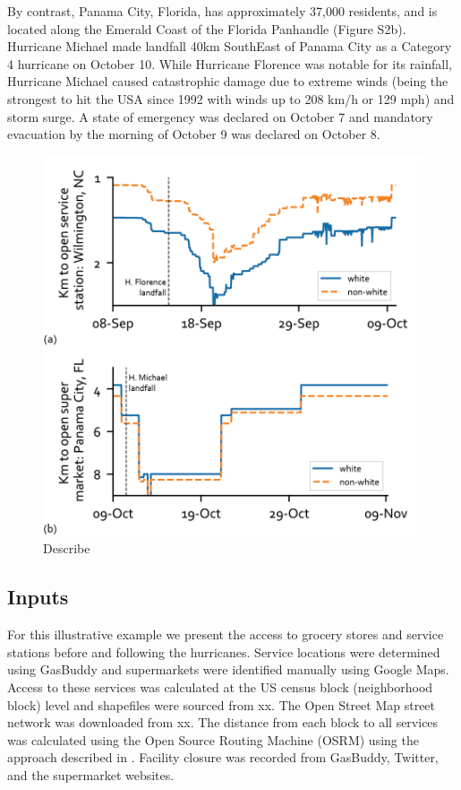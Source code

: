 \documentclass[9pt,twocolumn,twoside,lineno]{pnas-new}
\begin{document}
By contrast, Panama City, Florida, has approximately 37,000 residents, and is located along the Emerald Coast of the Florida Panhandle (Figure S2b). 
Hurricane Michael made landfall 40km SouthEast of Panama City as a Category 4 hurricane on October 10. 
While Hurricane Florence was notable for its rainfall, 
Hurricane Michael caused catastrophic damage due to extreme winds (being the strongest to hit the USA since 1992 with winds up to 208 km/h or 129 mph) and storm surge. 
A state of emergency was declared on October 7 and mandatory evacuation by the morning of October 9 was declared on October 8.

\begin{figure}
    \centering
    \includegraphics[width=\linewidth]{report/fig/Figure_3.png}
    \caption{Describe}
    \label{fig:equality}
\end{figure}

\subsection*{Inputs}
For this illustrative example we present the access to grocery stores and service stations before and following the hurricanes. 
Service locations were determined using GasBuddy  and supermarkets were identified manually using Google Maps.
Access to these services was calculated at the US census block (neighborhood block) level and shapefiles were sourced from xx. 
The Open Street Map street network was downloaded from xx. 
The distance from each block to all services was calculated using the Open Source Routing Machine (OSRM) using the approach described in \cite{Logan2017-fr}. 
Facility closure was recorded from GasBuddy, Twitter, and the supermarket websites.
\end{document}
